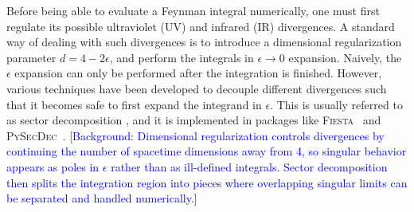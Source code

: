 \documentclass[a4paper,11pt]{article}
\begin{document}
Before being able to evaluate a Feynman integral numerically, one must first regulate its possible ultraviolet (UV)  and infrared (IR) divergences. A standard way of dealing with such divergences is to introduce a dimensional regularization parameter $d=4-2\epsilon$, and perform the integrals in $\epsilon\to 0$ expansion. Naively, the $\epsilon$ expansion can only be performed after the integration is finished. However, various techniques have been developed to decouple different divergences such that it becomes safe to first expand the integrand in $\epsilon$. This is usually referred to as sector decomposition \cite{Binoth:2000ps, Binoth:2003ak, Binoth:2004jv, Heinrich:2008si}, and it is implemented in packages like \textsc{Fiesta}~\cite{Smirnov:2008py,Smirnov:2009pb,Smirnov:2013eza,Smirnov:2015mct,Smirnov:2021rhf} and \textsc{PySecDec}~\cite{Borowka:2012yc, Borowka:2015mxa, Borowka:2017idc, Borowka:2018goh, Heinrich:2021dbf, Heinrich:2023til}. 
\textcolor{blue}{\small [Background: Dimensional regularization controls divergences by continuing the number of spacetime dimensions away from 4, so singular behavior appears as poles in $\epsilon$ rather than as ill-defined integrals. Sector decomposition then splits the integration region into pieces where overlapping singular limits can be separated and handled numerically.]}
\end{document}
